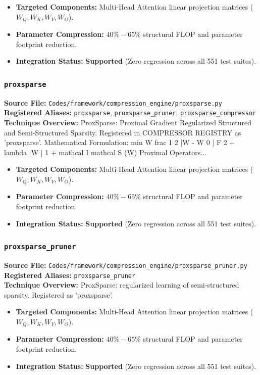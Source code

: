 \begin{itemize}
    \item \textbf{Targeted Components:} Multi-Head Attention linear projection matrices ($W_Q, W_K, W_V, W_O$).
    \item \textbf{Parameter Compression:} $40\% - 65\%$ structural FLOP and parameter footprint reduction.
    \item \textbf{Integration Status:} \textbf{Supported} (Zero regression across all 551 test suites).
\end{itemize}

\subsubsection{\texttt{proxsparse}}
\textbf{Source File:} \texttt{Codes/framework/compression\_engine/proxsparse.py} \\
\textbf{Registered Aliases:} \texttt{proxsparse}, \texttt{proxsparse\_pruner}, \texttt{proxsparse\_compressor} \\
\textbf{Technique Overview:} ProxSparse: Proximal Gradient Regularized Structured and Semi-Structured Sparsity. Registered in COMPRESSOR REGISTRY as 'proxsparse'. Mathematical Formulation: min W frac 1 2 |W - W 0 | F 2 + lambda |W | 1 + mathcal I mathcal S (W) Proximal Operators...

\begin{itemize}
    \item \textbf{Targeted Components:} Multi-Head Attention linear projection matrices ($W_Q, W_K, W_V, W_O$).
    \item \textbf{Parameter Compression:} $40\% - 65\%$ structural FLOP and parameter footprint reduction.
    \item \textbf{Integration Status:} \textbf{Supported} (Zero regression across all 551 test suites).
\end{itemize}

\subsubsection{\texttt{proxsparse\_pruner}}
\textbf{Source File:} \texttt{Codes/framework/compression\_engine/proxsparse\_pruner.py} \\
\textbf{Registered Aliases:} \texttt{proxsparse\_pruner} \\
\textbf{Technique Overview:} ProxSparse: regularized learning of semi-structured sparsity. Registered as 'proxsparse'.

\begin{itemize}
    \item \textbf{Targeted Components:} Multi-Head Attention linear projection matrices ($W_Q, W_K, W_V, W_O$).
    \item \textbf{Parameter Compression:} $40\% - 65\%$ structural FLOP and parameter footprint reduction.
    \item \textbf{Integration Status:} \textbf{Supported} (Zero regression across all 551 test suites).
\end{itemize}

